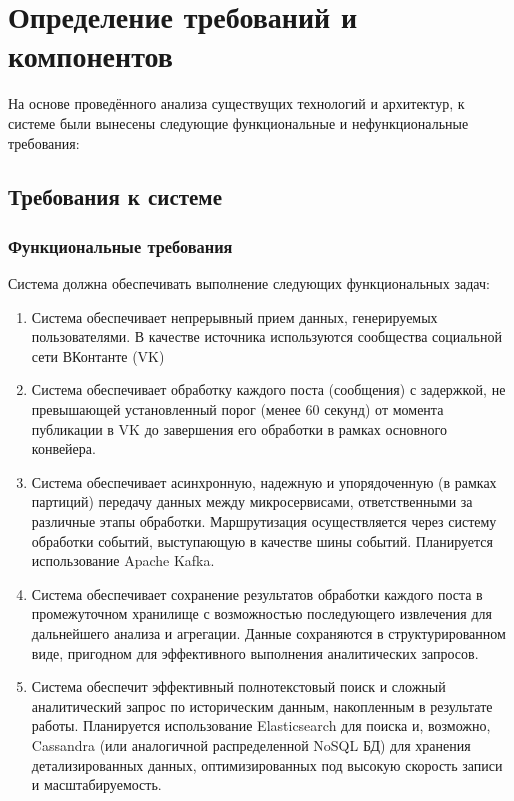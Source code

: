 \section{Определение требований и компонентов}
\label{sec:Chapter3} 
    На основе проведённого анализа существущих технологий и архитектур, к системе были вынесены следующие функциональные и нефункциональные требования:
    \subsection{Требования к системе}
        \subsubsection{Функциональные требования}
            Система должна обеспечивать выполнение следующих функциональных задач:
            \begin{enumerate}
                \item Система обеспечивает непрерывный прием данных, генерируемых пользователями. В качестве источника используются сообщества социальной сети ВКонтанте (VK) 
                \item Система обеспечивает обработку каждого поста (сообщения) с задержкой, не превышающей установленный порог (менее 60 секунд) от момента публикации в VK до завершения его обработки в рамках основного конвейера.
                \item Система обеспечивает асинхронную, надежную и упорядоченную (в рамках партиций) передачу данных между микросервисами, ответственными за различные этапы обработки. Маршрутизация осуществляется через систему обработки событий, выступающую в качестве шины событий. Планируется использование Apache Kafka.
                \item Система обеспечивает сохранение результатов обработки каждого поста в промежуточном хранилище с возможностью последующего извлечения для дальнейшего анализа и агрегации. Данные сохраняются в структурированном виде, пригодном для эффективного выполнения аналитических запросов.
                \item Система обеспечит эффективный полнотекстовый поиск и сложный аналитический запрос по историческим данным, накопленным в результате работы. Планируется использование Elasticsearch для поиска и, возможно, Cassandra (или аналогичной распределенной NoSQL БД) для хранения детализированных данных, оптимизированных под высокую скорость записи и масштабируемость.
            \end{enumerate}

